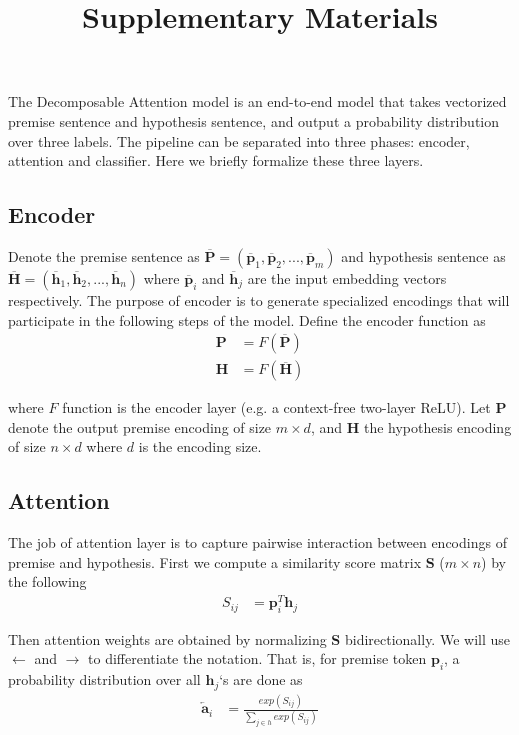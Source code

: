\documentclass[review,journal]{vgtc}         %
\title{
Supplementary Materials
}
\begin{document}
\maketitle

The Decomposable Attention model is an end-to-end model that takes vectorized premise sentence and hypothesis sentence, and output a probability distribution over three labels. The pipeline can be separated into three phases: encoder, attention and classifier. Here we briefly formalize these three layers.

\subsection{Encoder}
Denote the premise sentence as $\overline{\boldsymbol{P}} = (\overline{\boldsymbol{p}}_1, \overline{\boldsymbol{p}}_2, ..., \overline{\boldsymbol{p}}_m)$ and hypothesis sentence as $\overline{\boldsymbol{H}} = (\overline{\boldsymbol{h}}_1, \overline{\boldsymbol{h}}_2, ..., \overline{\boldsymbol{h}}_n)$ where $\overline{\boldsymbol{p}}_i$ and $\overline{\boldsymbol{h}}_j$ are the input embedding vectors respectively. The purpose of encoder is to generate specialized encodings that will participate in the following steps of the model. Define the encoder function as
\begin{align}
  \boldsymbol{P} &= F(\overline{\boldsymbol{P}})\\
  \boldsymbol{H} &= F(\overline{\boldsymbol{H}})
\end{align}

where $F$ function is the encoder layer (e.g. a context-free two-layer ReLU). Let $\boldsymbol{P}$ denote the output premise encoding of size $m \times d$, and $\boldsymbol{H}$ the hypothesis encoding of size $n \times d$ where $d$ is the encoding size.

\subsection{Attention} \label{sec:att}
The job of attention layer is to capture pairwise interaction between encodings of premise and hypothesis. First we compute a similarity score matrix $\boldsymbol{S}$ ($m \times n$) by the following
\begin{align}
  S_{ij} &= \boldsymbol{p}_i ^T \boldsymbol{h}_j
\end{align}

Then attention weights are obtained by normalizing $\boldsymbol{S}$ bidirectionally. We will use $\leftarrow$ and $\rightarrow$ to differentiate the notation. That is, for premise token $\boldsymbol{p}_i$, a probability distribution over all $\boldsymbol{h}_j$`s are done as
\begin{align}
  \overleftarrow{\boldsymbol{a}}_i &= \frac{exp(S_{ij})}{\sum_{j \in h} exp(S_{ij})}
\end{align}
\end{document}
